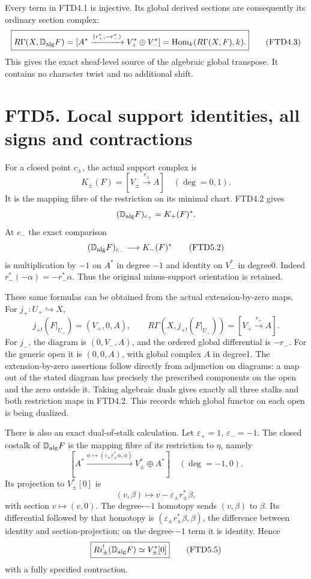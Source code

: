Every term in FTD4.1 is injective. Its global derived sections are
consequently its ordinary section complex: \[
\boxed{
R\Gamma(X,\mathbb D_{\rm alg}F)
=[A^*\xrightarrow{(r_+^*,-r_-^*)}V_+^*\oplus V_-^*]
=\operatorname{Hom}_k(R\Gamma(X,F),k).}
\tag{FTD4.3}
\] This gives the exact sheaf-level source of the algebraic global
transpose. It contains no character twist and no additional shift.

\section{FTD5. Local support identities, all signs and
contractions}\label{ftd5.-local-support-identities-all-signs-and-contractions}

For a closed point \(c_\pm\), the actual support complex is \[
K_\pm(F)=[V_\pm\xrightarrow{r_\pm}A]\quad(\deg=0,1).
\tag{FTD5.1}
\] It is the mapping fibre of the restriction on its minimal chart.
FTD4.2 gives \[
(\mathbb D_{\rm alg}F)_{c_+}=K_+(F)^*.
\] At \(c_-\) the exact comparison \[
(\mathbb D_{\rm alg}F)_{c_-}\longrightarrow K_-(F)^*
\tag{FTD5.2}
\] is multiplication by \(-1\) on \(A^*\) in degree \(-1\) and identity
on \(V_-^*\) in degree0. Indeed \(r_-^*(-\alpha)=-r_-^*\alpha\). Thus
the original minus-support orientation is retained.

These same formulas can be obtained from the actual extension-by-zero
maps. For \(j_+:U_+\hookrightarrow X\), \[
j_{+!}(F|_{U_+})=(V_+,0,A),\qquad
R\Gamma(X,j_{+!}(F|_{U_+}))=[V_+\xrightarrow{r_+}A].
\] For \(j_-\), the diagram is \((0,V_-,A)\), and the ordered global
differential is \(-r_-\). For the generic open it is \((0,0,A)\), with
global complex \(A\) in degree1. The extension-by-zero assertions follow
directly from adjunction on diagrams: a map out of the stated diagram
has precisely the prescribed components on the open and the zero outside
it. Taking algebraic duals gives exactly all three stalks and both
restriction maps in FTD4.2. This records which global functor on each
open is being dualized.

There is also an exact dual-of-stalk calculation. Let
\(\varepsilon_+=1\), \(\varepsilon_-=-1\). The closed costalk of
\(\mathbb D_{\rm alg}F\) is the mapping fibre of its restriction to
\(\eta\), namely \[
[A^*\xrightarrow{\alpha\mapsto
(\varepsilon_\pm r_\pm^*\alpha,\alpha)}
V_\pm^*\oplus A^*]
\quad(\deg=-1,0).
\tag{FTD5.3}
\] Its projection to \(V_\pm^*[0]\) is \[
(v,\beta)\longmapsto v-\varepsilon_\pm r_\pm^*\beta,
\tag{FTD5.4}
\] with section \(v\mapsto(v,0)\). The degree-\(-1\) homotopy sends
\((v,\beta)\) to \(\beta\). Its differential followed by that homotopy
is \((\varepsilon_\pm r_\pm^*\beta,\beta)\), the difference between
identity and section-projection; on the degree-\(-1\) term it is
identity. Hence \[
\boxed{R i_\pm^!(\mathbb D_{\rm alg}F)\simeq V_\pm^*[0]}
\tag{FTD5.5}
\] with a fully specified contraction.

